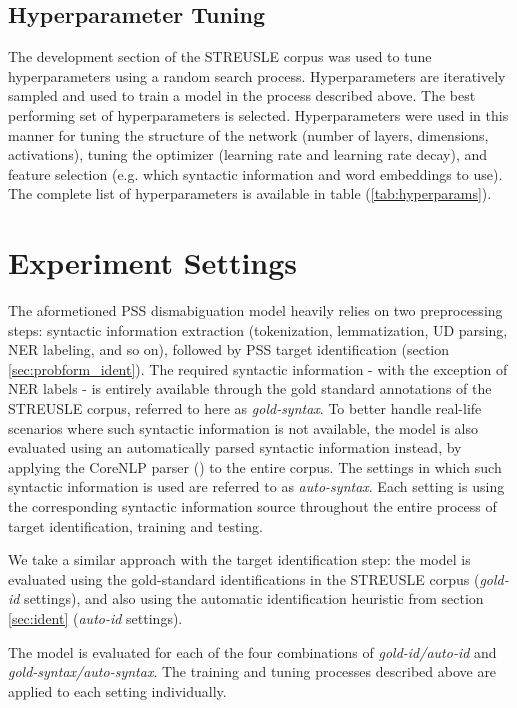 \subsection{Hyperparameter Tuning}

The development section of the STREUSLE corpus was used to tune hyperparameters using a random search process. Hyperparameters are iteratively sampled and used to train a model in the process described above. The best performing set of hyperparameters is selected. Hyperparameters were used in this manner for tuning the structure of the network (number of layers, dimensions, activations), tuning the optimizer (learning rate and learning rate decay), and feature selection (e.g. which syntactic information and word embeddings to use). The complete list of hyperparameters is available in table (\ref{tab:hyperparams}).

\section{Experiment Settings} \label{sec:psssettings}

The aformetioned PSS dismabiguation model heavily relies on two preprocessing steps: syntactic information extraction (tokenization, lemmatization, UD parsing, NER labeling, and so on), followed by PSS target identification (section \ref{sec:probform_ident}). The required syntactic information - with the exception of NER labels - is entirely available through the gold standard annotations of the STREUSLE corpus, referred to here as \textit{gold-syntax}. To better handle real-life scenarios where such syntactic information is not available, the model is also evaluated using an automatically parsed syntactic information instead, by applying the CoreNLP parser (\cite{manning14stanford}) to the entire corpus. The settings in which such syntactic information is used are referred to as \textit{auto-syntax}. Each setting is using the corresponding syntactic information source throughout the entire process of target identification, training and testing. 

We take a similar approach with the target identification step: the model is evaluated using the gold-standard identifications in the STREUSLE corpus (\textit{gold-id} settings), and also using the automatic identification heuristic from section \ref{sec:ident} (\textit{auto-id} settings).

The model is evaluated for each of the four combinations of \textit{gold-id/auto-id} and \textit{gold-syntax/auto-syntax}. The training and tuning processes described above are applied to each setting individually.

